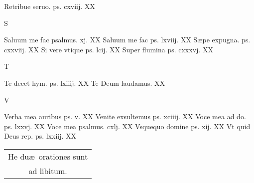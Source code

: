 \documentclass[a5paper,10pt]{book}
\def\ae{æ}
\begin{document}
\begin{multicols}{2}
\par \noindent Retribue seruo. ps. cxviij. \hfill XX
\newline \vspace{-1.75em}
\begin{center}
\color{red} S
\end{center}
\vspace{-.75em}
\par \noindent Saluum me fac psalmus. xj. \hfill XX
\newline Saluum me fac ps. lxviij. \hfill XX
\newline S\ae pe expugna. ps. cxxviij. \hfill XX
\newline Si vere vtique ps. lcij. \hfill XX
\newline Super flumina ps. cxxxvj. \hfill XX
\newline \vspace{-1.75em}
\begin{center}
\color{red} T
\end{center}
\vspace{-.75em}
\par \noindent Te decet hym. ps. lxiiij. \hfill XX
\newline Te Deum laudamus. \hfill XX
\newline \vspace{-1.75em}
\begin{center}
\color{red} V
\end{center}
\vspace{-.75em}
\par \noindent Verba mea auribus ps. v. \hfill XX
\newline Venite exsultemus ps. xciiij. \hfill XX%
\newline Voce mea ad do. ps. lxxvj. \hfill XX
\newline Voce mea psalmus. cxlj. \hfill XX
\newline Vsquequo domine ps. xij. \hfill XX
\newline Vt quid Deus rep. ps. lxxiij. \hfill XX
\begin{center}
\begin{tabular}{l r}
\multicolumn{2}{c}{He du\ae \ orationes sunt}\\
\multicolumn{2}{c}{ad libitum.}
\end{tabular}
\end{center}
\end{multicols}
\end{document}
